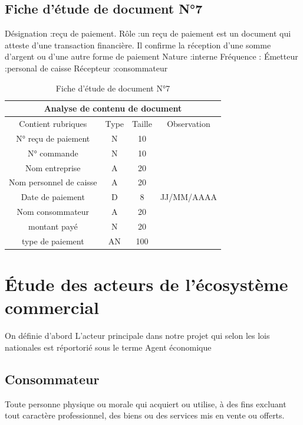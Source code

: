 \documentclass[edit,12pt,a4paper,ChapStyle,oneside,doubleinterligne]{report}
\begin{document}
\subsection{Fiche d’étude de document N°7}
Désignation :reçu de paiement.
\newline Rôle :un reçu de paiement est un document qui atteste d'une transaction financière. Il confirme la réception d'une somme d'argent ou d'une autre forme de paiement
\newline Nature :interne
\newline Fréquence :
\newline Émetteur :personal de caisse
\newline Récepteur :consommateur \cite{reçu}
\begin{table}[h!]
    \centering
    \begin{tabular}{|c|c|c|c|}
         \hline
\multicolumn{4}{|c|}{Analyse de contenu de document}\\
\hline
Contient rubriques & Type & Taille & Observation\\
\hline
 N° reçu de paiement & N & 10 & \\
 N° commande  & N & 10 & \\
 Nom entreprise & A & 20 & \\
 Nom personnel de caisse & A & 20 & \\
 Date de paiement & D & 8 & JJ/MM/AAAA \\
Nom consommateur & A & 20 & \\
montant payé & N & 20 & \\
type de paiement & AN & 100 & \\
\hline
    \end{tabular}
    \caption{Fiche d’étude de document N°7}
    \label{tab:7}
\end{table}
\section{Étude des acteurs de l'écosystème commercial}
On définie d’abord L’acteur principale dans notre projet qui selon les lois nationales est réportorié sous le terme Agent économique
\subsection{Consommateur}
Toute personne physique ou morale qui acquiert ou utilise, à des fins excluant tout caractère professionnel, des biens ou des services mis en vente ou offerts.\cite{Consommateur}  
\end{document}
